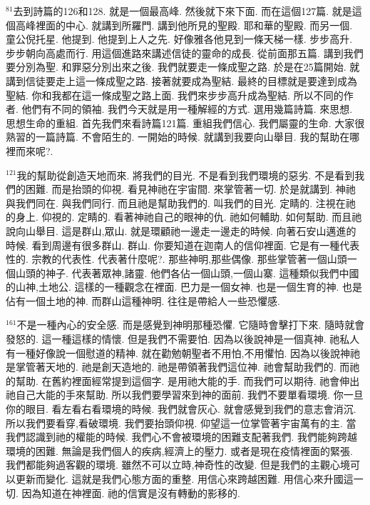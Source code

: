 \documentclass{book}
\begin{document}
$^{81}$去到詩篇的126和128.
就是一個最高峰.
然後就下來下面.
而在這個127篇.
就是這個高峰裡面的中心.
就講到所羅門.
講到他所見的聖殿.
耶和華的聖殿.
而另一個.
童公倪托星.
他提到.
他提到上人之先.
好像雅各他見到一條天梯一樣.
步步高升.
步步朝向高處而行.
用這個進路來講述信徒的靈命的成長.
從前面那五篇.
講到我們要分別為聖.
和罪惡分別出來之後.
我們就要走一條成聖之路.
於是在25篇開始.
就講到信徒要走上這一條成聖之路.
接著就要成為聖結.
最終的目標就是要達到成為聖結.
你和我都在這一條成聖之路上面.
我們來步步高升成為聖結.
所以不同的作者.
他們有不同的領袖.
我們今天就是用一種解經的方式.
選用幾篇詩篇.
來思想.
思想生命的重組.
首先我們來看詩篇121篇.
重組我們信心.
我們屬靈的生命.
大家很熟習的一篇詩篇.
不會陌生的.
一開始的時候.
就講到我要向山舉目.
我的幫助在哪裡而來呢?.

$^{121}$我的幫助從創造天地而來.
將我們的目光.
不是看到我們環境的惡劣.
不是看到我們的困難.
而是抬頭的仰視.
看見神祂在宇宙間.
來掌管著一切.
於是就講到.
神祂與我們同在.
與我們同行.
而且祂是幫助我們的.
叫我們的目光.
定睛的.
注視在祂的身上.
仰視的.
定睛的.
看著神祂自己的眼神的仇.
祂如何輔助.
如何幫助.
而且祂說向山舉目.
這是群山,眾山.
就是環顧祂一邊走一邊走的時候.
向著石安山邁進的時候.
看到周邊有很多群山.
群山.
你要知道在迦南人的信仰裡面.
它是有一種代表性的.
宗教的代表性.
代表著什麼呢?.
那些神明,那些偶像.
那些掌管著一個山頭一個山頭的神子.
代表著眾神,諸靈.
他們各佔一個山頭,一個山寨.
這種類似我們中國的山神,土地公.
這樣的一種觀念在裡面.
巴力是一個女神.
也是一個生育的神.
也是佔有一個土地的神.
而群山這種神明.
往往是帶給人一些恐懼感.

$^{161}$不是一種內心的安全感.
而是感覺到神明那種恐懼.
它隨時會擊打下來.
隨時就會發怒的.
這一種這樣的情懷.
但是我們不需要怕.
因為以後說神是一個真神.
祂私人有一種好像說一個慰道的精神.
就在勸勉朝聖者不用怕,不用懼怕.
因為以後說神祂是掌管著天地的.
祂是創天造地的.
祂是帶領著我們這位神.
祂會幫助我們的.
而祂的幫助.
在舊約裡面經常提到這個字.
是用祂大能的手.
而我們可以期待.
祂會伸出祂自己大能的手來幫助.
所以我們要學習來到神的面前.
我們不要單看環境.
你一旦你的眼目.
看左看右看環境的時候.
我們就會灰心.
就會感覺到我們的意志會消沉.
所以我們要看穿,看破環境.
我們要抬頭仰視.
仰望這一位掌管著宇宙萬有的主.
當我們認識到祂的權能的時候.
我們心不會被環境的困難支配著我們.
我們能夠跨越環境的困難.
無論是我們個人的疾病,經濟上的壓力.
或者是現在疫情裡面的緊張.
我們都能夠過客觀的環境.
雖然不可以立時,神奇性的改變.
但是我們的主觀心境可以更新而變化.
這就是我們心態方面的重整.
用信心來跨越困難.
用信心來升國這一切.
因為知道在神裡面.
祂的信實是沒有轉動的影移的.
\end{document}
